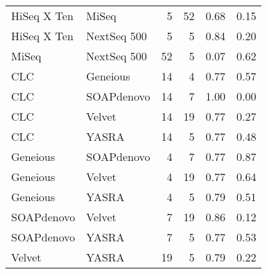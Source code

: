 \begin{table}[ht]
\begin{tabular}{llrrrr}
  HiSeq X Ten & MiSeq &   5 &  52 & 0.68 & 0.15 \\ 
  HiSeq X Ten & NextSeq 500 &   5 &   5 & 0.84 & 0.20 \\ 
  MiSeq & NextSeq 500 &  52 &   5 & 0.07 & 0.62 \\ 
  \hline
  CLC & Geneious &  14 &   4 & 0.77 & 0.57 \\ 
  CLC & SOAPdenovo &  14 &   7 & 1.00 & 0.00 \\ 
  CLC & Velvet &  14 &  19 & 0.77 & 0.27 \\ 
  CLC & YASRA &  14 &   5 & 0.77 & 0.48 \\ 
  Geneious & SOAPdenovo &   4 &   7 & 0.77 & 0.87 \\ 
  Geneious & Velvet &   4 &  19 & 0.77 & 0.64 \\ 
  Geneious & YASRA &   4 &   5 & 0.79 & 0.51 \\ 
  SOAPdenovo & Velvet &   7 &  19 & 0.86 & 0.12 \\ 
  SOAPdenovo & YASRA &   7 &   5 & 0.77 & 0.53 \\ 
  Velvet & YASRA &  19 &   5 & 0.79 & 0.22 \\ 
   \hline
\end{tabular}
\end{table}
